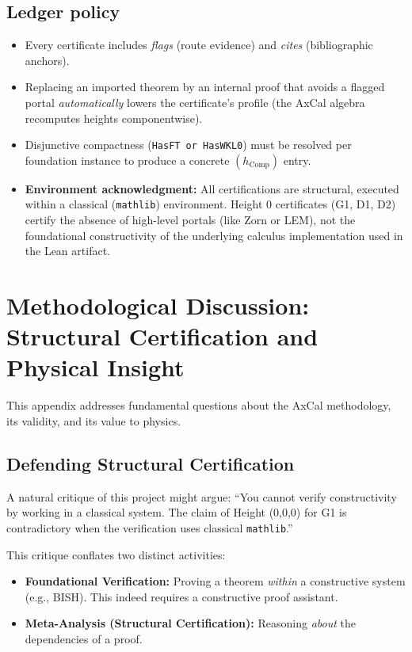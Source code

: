 \documentclass[11pt]{article}
\theoremstyle{definition}
\theoremstyle{remark}
\newcommand{\hComp}{h_{\mathrm{Comp}}}        %
\begin{document}
\subsection{Ledger policy}
\begin{itemize}
\item Every certificate includes \emph{flags} (route evidence) and \emph{cites} (bibliographic anchors).
\item Replacing an imported theorem by an internal proof that avoids a flagged portal \emph{automatically} lowers the certificate's profile (the AxCal algebra recomputes heights componentwise).
\item Disjunctive compactness (\verb|HasFT or HasWKL0|) must be resolved per foundation instance to produce a concrete $(\hComp)$ entry.
\item \textbf{Environment acknowledgment:} All certifications are structural, executed within a classical (\texttt{mathlib}) environment. Height 0 certificates (G1, D1, D2) certify the absence of high-level portals (like Zorn or LEM), not the foundational constructivity of the underlying calculus implementation used in the Lean artifact.
\end{itemize}

\section{Methodological Discussion: Structural Certification and Physical Insight}
\label{app:methodology}

This appendix addresses fundamental questions about the AxCal methodology, its validity, and its value to physics.

\subsection{Defending Structural Certification}

A natural critique of this project might argue: ``You cannot verify constructivity by working in a classical system. The claim of Height (0,0,0) for G1 is contradictory when the verification uses classical \texttt{mathlib}.''

This critique conflates two distinct activities:

\begin{itemize}
\item \textbf{Foundational Verification:} Proving a theorem \emph{within} a constructive system (e.g., BISH). This indeed requires a constructive proof assistant.
\item \textbf{Meta-Analysis (Structural Certification):} Reasoning \emph{about} the dependencies of a proof.
\end{itemize}
\end{document}
